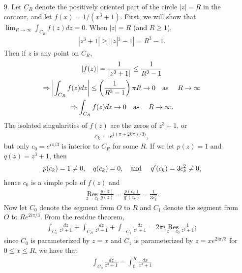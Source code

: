 \documentclass[a4paper,12pt]{article}
\begin{document}
\begin{enumerate}
    \item[9.]
        Let $C_R$ denote the positively oriented part of the circle $|z| = R$ in the contour, and let $f(x) = 1/(x^3 + 1)$. First, we will show that $\lim_{R \to \infty} \int_{C_R} f(z) dz = 0$. When $|z| = R$ (and $R \geq 1$),
        \begin{gather*}
            |z^3 + 1| \geq ||z|^3 - 1| = R^3 - 1.
        \end{gather*}
        Then if $z$ is any point on $C_R$,
        \begin{gather*}
            |f(z)| = \frac{1}{|z^3 + 1|} \leq \frac{1}{R^3 - 1} \\
            \Rightarrow \left| \int_{C_R} f(z) dz \right| \leq \left( \frac{1}{R^3 - 1} \right) \pi R \to 0 \text{\quad as \quad} R \to \infty \\
            \Rightarrow \int_{C_R} f(z) dz \to 0 \text{\quad as \quad} R \to \infty.
        \end{gather*}
        The isolated singularities of $f(z)$ are the zeros of $z^3 + 1$, or
        \begin{align*}
            c_k = e^{i(\pi + 2k\pi)/3)},
        \end{align*}
        but only $c_0 = e^{i\pi/3}$ is interior to $C_R$ for some $R$. If we let $p(z) = 1$ and $q(z) = z^3 + 1$, then
        \begin{align*}
            p(c_k) = 1 \neq 0, \quad q(c_k) = 0, \text{\quad and \quad} q'(c_k) = 3c_k^2 \neq 0;
        \end{align*}
        hence $c_0$ is a simple pole of $f(z)$ and
        \begin{align*}
            \underset{z = c_k}{\text{\ Res\ }} \frac{p(z)}{q(z)} = \frac{p(c_k)}{q'(c_k)} = \frac{1}{3c_k^2}.
        \end{align*}
        Now let $C_0$ denote the segment from $O$ to $R$ and $C_1$ denote the segment from $O$ to $Re^{2i\pi/3}$. From the residue theorem,
        \begin{align}
            \int_{C_0} \frac{dz}{z^3 + 1} + \int_{C_R} \frac{dz}{z^3 + 1} + \int_{-C_1} \frac{dz}{z^3 + 1} = 2\pi i \underset{z = c_0}{\text{\ Res\ }} \frac{1}{z^3 + 1}; \label{eq:residue}
        \end{align}
        since $C_0$ is parameterized by $z = x$ and $C_1$ is parameterized by $z = xe^{2i\pi/3}$ for $0 \leq x \leq R$, we have that
        \begin{gather*}
            \int_{C_0} \frac{dz}{z^3 + 1} = \int_0^R \frac{dx}{x^3 + 1} \\

\end{gather*}
\end{enumerate}
\end{document}
